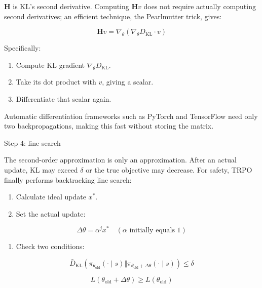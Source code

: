 \(\mathbf{H}\) is KL's second derivative. Computing \(\mathbf{H}v\) does not require actually computing second derivatives; an efficient technique, the Pearlmutter trick, gives:

\[
\mathbf{H}v
=
\nabla_\theta(\nabla_\theta D_{\mathrm{KL}}\cdot v)
\]

Specifically:

\begin{enumerate}
\def\labelenumi{\arabic{enumi}.}
\tightlist
\item
  Compute KL gradient \(\nabla_\theta D_{\mathrm{KL}}\).
\item
  Take its dot product with \(v\), giving a scalar.
\item
  Differentiate that scalar again.
\end{enumerate}

Automatic differentiation frameworks such as PyTorch and TensorFlow need only two backpropagations, making this fast without storing the matrix.

Step 4: line search

The second-order approximation is only an approximation. After an actual update, KL may exceed \(\delta\) or the true objective may decrease. For safety, TRPO finally performs backtracking line search:

\begin{enumerate}
\def\labelenumi{\arabic{enumi}.}
\tightlist
\item
  Calculate ideal update \(x^{*}\).
\item
{}
  Set the actual update:
\end{enumerate}

\[
\Delta\theta=\alpha^{j} x^{*}
\quad
(\alpha \text{ initially equals } 1)
\]

\begin{enumerate}
\def\labelenumi{\arabic{enumi}.}
\setcounter{enumi}{2}
\tightlist
\item
{}
  Check two conditions:
\end{enumerate}

\[
\bar{D}_{\mathrm{KL}}(
\pi_{\theta_{\mathrm{old}}}(\cdot\mid s)
\Vert
\pi_{\theta_{\mathrm{old}}+\Delta\theta}(\cdot\mid s)
)\le \delta
\]

\[
L(\theta_{\mathrm{old}}+\Delta\theta)\ge L(\theta_{\mathrm{old}})
\]

